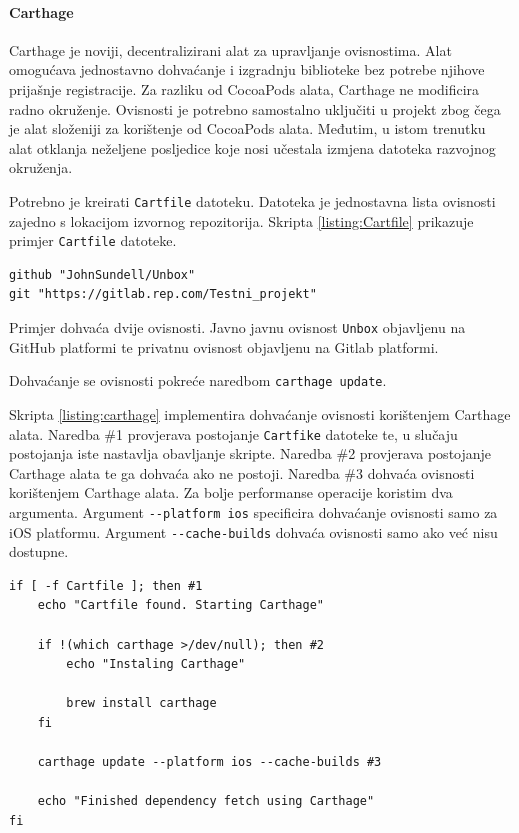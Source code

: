 \documentclass[times, utf8, diplomski, numeric]{fer}
\begin{document}
\paragraph{Carthage}

Carthage je noviji, decentralizirani alat za upravljanje ovisnostima. Alat omogućava jednostavno dohvaćanje i izgradnju biblioteke bez potrebe njihove prijašnje registracije. Za razliku od CocoaPods alata, Carthage ne modificira radno okruženje. Ovisnosti je potrebno samostalno uključiti u projekt zbog čega je alat složeniji za korištenje od CocoaPods alata. Međutim, u istom trenutku alat otklanja neželjene posljedice koje nosi učestala izmjena datoteka razvojnog okruženja.

Potrebno je kreirati \verb|Cartfile| datoteku. Datoteka je jednostavna lista ovisnosti zajedno s lokacijom izvornog repozitorija. Skripta \ref{listing:Cartfile} prikazuje primjer \verb|Cartfile| datoteke.

\begin{lstlisting}[caption=Primjer Cartfile datoteke, label=listing:Cartfile]
github "JohnSundell/Unbox"
git "https://gitlab.rep.com/Testni_projekt"
\end{lstlisting}

Primjer dohvaća dvije ovisnosti. Javno javnu ovisnost \verb|Unbox| objavljenu na GitHub platformi te privatnu ovisnost objavljenu na Gitlab platformi.

Dohvaćanje se ovisnosti pokreće naredbom \verb|carthage update|.

Skripta \ref{listing:carthage} implementira dohvaćanje ovisnosti korištenjem Carthage alata. Naredba \#1 provjerava postojanje \verb|Cartfike| datoteke te, u slučaju postojanja iste nastavlja obavljanje skripte. Naredba \#2 provjerava postojanje Carthage alata te ga dohvaća ako ne postoji. Naredba \#3 dohvaća ovisnosti korištenjem Carthage alata. Za bolje performanse operacije koristim dva argumenta. Argument \verb|--platform ios| specificira dohvaćanje ovisnosti samo za iOS platformu. Argument \verb|--cache-builds| dohvaća ovisnosti samo ako već nisu dostupne.

\begin{lstlisting}[caption=Dohvat ovisnosti korištenjem alata Carthage, label=listing:carthage]
if [ -f Cartfile ]; then #1
    echo "Cartfile found. Starting Carthage"

    if !(which carthage >/dev/null); then #2
        echo "Instaling Carthage"

        brew install carthage
    fi

    carthage update --platform ios --cache-builds #3

    echo "Finished dependency fetch using Carthage"
fi
\end{lstlisting}
\end{document}
